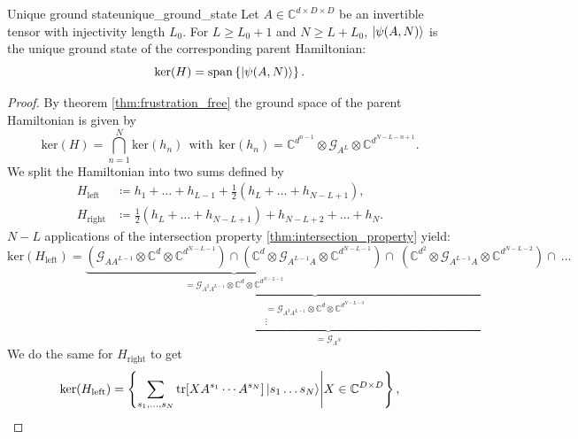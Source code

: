 \begin{theorem}{Unique ground state}{unique_ground_state}
Let $A \in \mathbb{C}^{d \times D \times D}$ be an invertible tensor with injectivity length $L_0$. For $L \geq L_0+1$ and $N \geq L+L_0$, $\ket{\psi(A,N)}$ is the unique ground state of the corresponding parent Hamiltonian:
\begin{equation}
	\mathrm{ker}(H) = \mathrm{span}\left\{\ket{\psi(A,N)}\right\}.
\end{equation}

\end{theorem}
\begin{proof}
By theorem \ref{thm:frustration_free} the ground space of the parent Hamiltonian is given by
\begin{equation}
	\mathrm{ker}(H) = \bigcap_{n=1}^N \mathrm{ker}(h_n) \:\:\text{with}\:\: \mathrm{ker}(h_n) = \mathbb{C}^{d^{n-1}} \otimes \mathcal{G}_{A^L} \otimes \mathbb{C}^{d^{N-L-n+1}}.
\end{equation}
We split the Hamiltonian into two sums defined by
\begin{align}
	H_{\mathrm{left}} &\coloneqq h_1 + \ldots + h_{L-1} + \frac{1}{2}(h_L + \ldots + h_{N-L+1}), \label{eq_H_left} \\ 
	H_{\mathrm{right}} &\coloneqq \frac{1}{2}(h_L + \ldots + h_{N-L+1}) + h_{N-L+2} + \ldots + h_{N}. \label{eq_H_right}
\end{align}
$N-L$ applications of the intersection property \ref{thm:intersection_property} yield:
\begin{equation*}
	\mathrm{ker}(H_{\mathrm{left}}) = \underbrace{\underbrace{\underbrace{(\mathcal{G}_{AA^{L-1}} \otimes \mathbb{C}^d \otimes \mathbb{C}^{d^{N-L-1}}) \cap (\mathbb{C}^d \otimes \mathcal{G}_{A^{L-1}A} \otimes \mathbb{C}^{d^{N-L-1}})}_{= \mathcal{G}_{A^2A^{L-1}} \otimes \mathbb{C}^d \otimes \mathbb{C}^{d^{N-L-2}}} \cap\: (\mathbb{C}^{d^2} \otimes \mathcal{G}_{A^{L-1}A} \otimes \mathbb{C}^{d^{N-L-2}})}_{\begin{array}{c} = \mathcal{G}_{A^3A^{L-1}} \otimes \mathbb{C}^d \otimes \mathbb{C}^{d^{N-L-3}} \\ \vdots \end{array}} \cap\: \ldots }_{= \mathcal{G}_{A^N}} 
\end{equation*}
We do the same for $H_{\mathrm{right}}$ to get
\begin{align}
	\mathrm{ker}(H_{\mathrm{left}}) &= \left\{ \sum_{s_1, \ldots, s_N} \tr[X A^{s_1} \cdots A^{s_N}] \ket{s_1 \ldots s_N} \middle\vert X \in \mathbb{C}^{D \times D} \right\}, \\

\end{align}
\end{proof}
